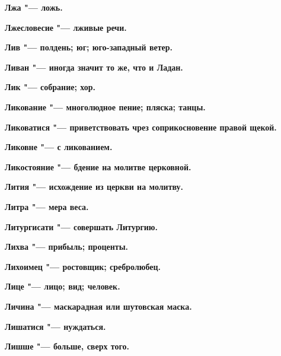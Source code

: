 \bfseries Лжа \normalfont{} "--- ложь. 




\bfseries Лжесловесие \normalfont{} "--- лживые речи. 




\bfseries Лив \normalfont{} "--- полдень; юг; юго-западный ветер. 




\bfseries Ливан \normalfont{} "--- иногда значит то же, что и Ладан. 




\bfseries Лик \normalfont{} "--- собрание; хор. 




\bfseries Ликование \normalfont{} "--- многолюдное пение; пляска; танцы. 




\bfseries Ликоватися \normalfont{} "--- приветствовать чрез соприкосновение правой щекой. 




\bfseries Ликовне \normalfont{} "--- с ликованием. 




\bfseries Ликостояние \normalfont{} "--- бдение на молитве церковной. 




\bfseries Лития \normalfont{} "--- исхождение из церкви на молитву. 




\bfseries Литра \normalfont{} "--- мера веса. 




\bfseries Литургисати \normalfont{} "--- совершать Литургию. 




\bfseries Лихва \normalfont{} "--- прибыль; проценты. 




\bfseries Лихоимец \normalfont{} "--- ростовщик; сребролюбец. 




\bfseries Лице \normalfont{} "--- лицо; вид; человек. 




\bfseries Личина \normalfont{} "--- маскарадная или шутовская маска. 




\bfseries Лишатися \normalfont{} "--- нуждаться. 




\bfseries Лишше \normalfont{} "--- больше, сверх того. 





